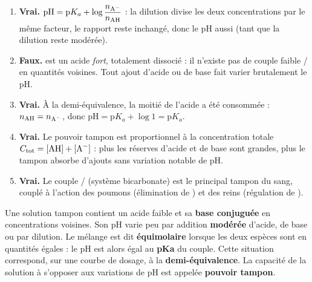 \documentclass[11pt]{article}
\begin{document}
\begin{corrige}
\begin{enumerate}
  \item \textbf{Vrai.} $\mathrm{pH} = \mathrm{p}K_a + \log\dfrac{n_{\ce{A-}}}{n_{\ce{AH}}}$ : la dilution divise les deux concentrations par le même facteur, le rapport reste inchangé, donc le pH aussi (tant que la dilution reste modérée).
  \item \textbf{Faux.}  est un acide \emph{fort}, totalement dissocié : il n'existe pas de couple faible / en quantités voisines. Tout ajout d'acide ou de base fait varier brutalement le pH.
  \item \textbf{Vrai.} À la demi-équivalence, la moitié de l'acide a été consommée : $n_{\ce{AH}} = n_{\ce{A-}}$, donc $\mathrm{pH} = \mathrm{p}K_a + \log 1 = \mathrm{p}K_a$.
  \item \textbf{Vrai.} Le pouvoir tampon est proportionnel à la concentration totale $C_{\text{tot}} = [\ce{AH}] + [\ce{A-}]$ : plus les réserves d'acide et de base sont grandes, plus le tampon absorbe d'ajouts sans variation notable de pH.
  \item \textbf{Vrai.} Le couple / (système bicarbonate) est le principal tampon du sang, couplé à l'action des poumons (élimination de ) et des reins (régulation de ).
\end{enumerate}
\end{corrige}

\begin{corrige}
Une solution tampon contient un acide faible et sa \textbf{base conjuguée} en concentrations voisines. Son pH varie peu par addition \textbf{modérée} d'acide, de base ou par dilution. Le mélange est dit \textbf{équimolaire} lorsque les deux espèces sont en quantités égales : le pH est alors égal au \textbf{pKa} du couple. Cette situation correspond, sur une courbe de dosage, à la \textbf{demi-équivalence}. La capacité de la solution à s'opposer aux variations de pH est appelée \textbf{pouvoir tampon}.
\end{corrige}
\end{document}
